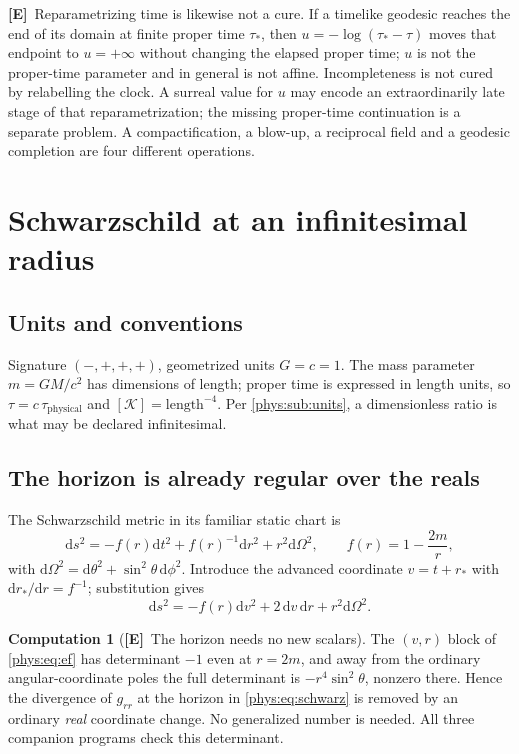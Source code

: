 \documentclass[11pt,letterpaper]{article}
\numberwithin{equation}{section}
\theoremstyle{definition}
\newtheorem{computation}[theorem]{Computation}
\theoremstyle{remark}
\newcommand{\Kret}{\mathcal K}
\newcommand{\dd}{\mathrm d}
\newcommand{\TE}{\textcolor{TierE}{\textsf{\bfseries[E]}}}
\begin{document}
\TE\ Reparametrizing time is likewise not a cure. If a timelike geodesic
reaches the end of its domain at finite proper time $\tau_{*}$, then
$u=-\log(\tau_{*}-\tau)$ moves that endpoint to $u=+\infty$ without changing
the elapsed proper time; $u$ is not the proper-time parameter and in general is
not affine. Incompleteness is not cured by relabelling the clock. A surreal
value for $u$ may encode an extraordinarily late stage of that
reparametrization; the missing proper-time continuation is a separate problem.
A compactification, a blow-up, a reciprocal field and a geodesic completion are
four different operations.

\section{Schwarzschild at an infinitesimal radius}
\label{phys:sec:schwarzschild}

\subsection{Units and conventions}
\label{phys:sub:units2}

Signature $(-,+,+,+)$, geometrized units $G=c=1$. The mass parameter $m=GM/c^{2}$
has dimensions of length; proper time is expressed in length units, so
$\tau=c\,\tau_{\text{physical}}$ and $[\Kret]=\text{length}^{-4}$. Per
\cref{phys:sub:units}, a dimensionless ratio is what may be declared
infinitesimal.

\subsection{The horizon is already regular over the reals}
\label{phys:sub:horizon}

The Schwarzschild metric in its familiar static chart is
\begin{equation}\label{phys:eq:schwarz}
\dd s^{2}=-f(r)\dd t^{2}+f(r)^{-1}\dd r^{2}+r^{2}\dd\Omega^{2},
\qquad f(r)=1-\frac{2m}{r},
\end{equation}
with $\dd\Omega^{2}=\dd\theta^{2}+\sin^{2}\theta\,\dd\phi^{2}$. Introduce the
advanced coordinate $v=t+r_{*}$ with $\dd r_{*}/\dd r=f^{-1}$; substitution
gives
\begin{equation}\label{phys:eq:ef}
\dd s^{2}=-f(r)\dd v^{2}+2\,\dd v\,\dd r+r^{2}\dd\Omega^{2}.
\end{equation}

\begin{computation}[\TE\ The horizon needs no new scalars]
\label{phys:comp:horizon}
The $(v,r)$ block of \eqref{phys:eq:ef} has determinant $-1$ even at $r=2m$,
and away from the ordinary angular-coordinate poles the full determinant is
$-r^{4}\sin^{2}\theta$, nonzero there. Hence the divergence of $g_{rr}$ at the
horizon in \eqref{phys:eq:schwarz} is removed by an ordinary \emph{real}
coordinate change. No generalized number is needed. All three companion
programs check this determinant.
\end{computation}
\end{document}
